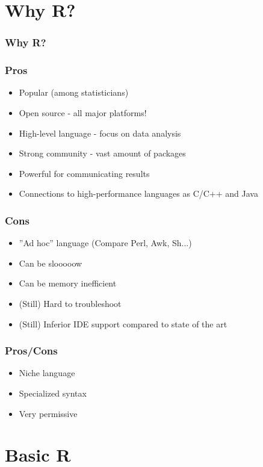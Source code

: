 \documentclass{beamer}
\begin{document}
\section{Why R?}

\begin{frame}
	\frametitle{Why R?}
\end{frame}

\begin{frame}
	\frametitle{Pros}
	\begin{itemize}
		\item Popular (among statisticians)
		\item Open source - all major platforms!
		\item High-level language - focus on data analysis
		\item Strong community - vast amount of packages
		\item Powerful for communicating results
		\item Connections to high-performance languages as C/C++ and Java
	\end{itemize}
\end{frame}

\begin{frame}
	\frametitle{Cons}
	\begin{itemize}
		\item ''Ad hoc'' language (Compare Perl, Awk, Sh...)
		\item Can be slooooow
		\item Can be memory inefficient
		\item (Still) Hard to troubleshoot
		\item (Still) Inferior IDE support compared to state of the art
	\end{itemize}
\end{frame}

\begin{frame}
	\frametitle{Pros/Cons}
	\begin{itemize}
		\item Niche language
		\item Specialized syntax
		\item Very permissive
	\end{itemize}
\end{frame}

\section{Basic R}
\end{document}
